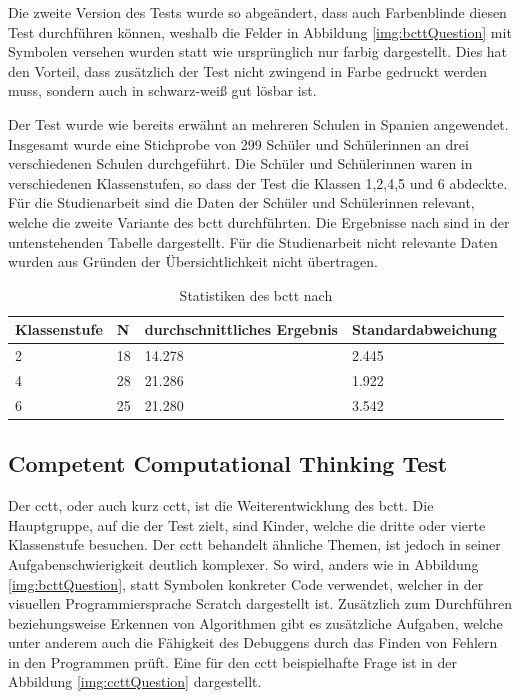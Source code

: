Die zweite Version des Tests wurde so abgeändert, dass auch Farbenblinde diesen Test durchführen können, weshalb die Felder in Abbildung \ref{img:bcttQuestion} mit Symbolen versehen wurden statt wie ursprünglich nur farbig dargestellt. Dies hat den Vorteil, dass zusätzlich der Test nicht zwingend in Farbe gedruckt werden muss, sondern auch in schwarz-weiß gut lösbar ist. \cite{bcct}

Der Test wurde wie bereits erwähnt an mehreren Schulen in Spanien angewendet. Insgesamt wurde eine Stichprobe von 299 Schüler und Schülerinnen an drei verschiedenen Schulen durchgeführt. Die Schüler und Schülerinnen waren in verschiedenen Klassenstufen, so dass der Test die Klassen 1,2,4,5 und 6 abdeckte. Für die Studienarbeit sind die Daten der Schüler und Schülerinnen relevant, welche die zweite Variante des \acrshort{bctt} durchführten. Die Ergebnisse nach \citeauthor{bcct} sind in der untenstehenden Tabelle dargestellt. Für die Studienarbeit nicht relevante Daten wurden aus Gründen der Übersichtlichkeit nicht übertragen.

\begin{table}[H]
	\centering
	\begin{tabular}{|l|l|l|l|}
		\hline
		\rowcolor[HTML]{C0C0C0} 
		Klassenstufe & N  & durchschnittliches Ergebnis & Standardabweichung \\ \hline
		2            & 18 & 14.278                      & 2.445              \\ \hline
		4            & 28 & 21.286                      & 1.922              \\ \hline
		6            & 25 & 21.280                      & 3.542              \\ \hline
	\end{tabular}
	\caption[Statistiken des \acrshort{bctt}]{Statistiken des \acrshort{bctt} nach \citeauthor{bcct}}
	\label{tab:statisticsBCTT}
\end{table}

\subsection{Competent Computational Thinking Test}

Der \acrlong{cctt}, oder auch kurz \acrshort{cctt}, ist die Weiterentwicklung des \acrshort{bctt}. Die Hauptgruppe, auf die der Test zielt, sind Kinder, welche die dritte oder vierte Klassenstufe besuchen. Der \acrshort{cctt} behandelt ähnliche Themen, ist jedoch in seiner Aufgabenschwierigkeit deutlich komplexer. So wird, anders wie in Abbildung \ref{img:bcttQuestion}, statt Symbolen konkreter Code verwendet, welcher in der visuellen Programmiersprache Scratch dargestellt ist. Zusätzlich zum Durchführen beziehungsweise Erkennen von Algorithmen gibt es zusätzliche Aufgaben, welche unter anderem auch die Fähigkeit des Debuggens durch das Finden von Fehlern in den Programmen prüft. Eine für den \acrshort{cctt} beispielhafte Frage ist in der Abbildung \ref{img:ccttQuestion} dargestellt.


